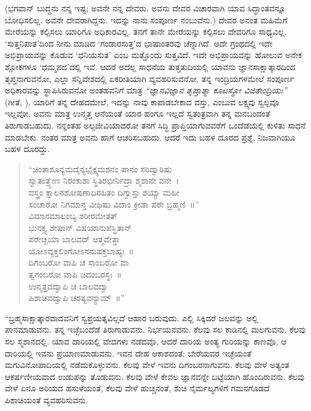 (ಭಗವಾನ್ ಬುದ್ಧನು ನನ್ನ ಇಷ್ಟ; ಅವನೇ ನನ್ನ ದೇವರು. ಅವನು ದೇವರ ವಿಚಾರವಾಗಿ ಯಾವ ಸಿದ್ಧಾಂತವನ್ನೂ ಬೋಧಿಸಲಿಲ್ಲ. ಅವನೇ ದೇವರಾಗಿದ್ದನು. ಇದನ್ನು ನಾನು ಸಂಪೂರ್ಣ ನಂಬುವೆನು.) ದೇವರ ಅನಂತ ಮಹಿಮೆಗೆ ಮೇರೆಯನ್ನು ಕಲ್ಪಿಸಲು ಯಾರಿಗೂ ಅಧಿಕಾರವಿಲ್ಲ. ತನಗೆ ತಾನೇ ಮೇರೆಯನ್ನು ಕಲ್ಪಿಸಲು ದೇವರಿಗೂ ಸಾಧ್ಯವಿಲ್ಲ. ‘ಸುತ್ತನಿಪಾತ’ದಿಂದ ನೀನು ಮಾಡಿದ ‘ಗಂಡಾರಸುತ್ತ’ದ ಭಾಷಾಂತರವು ಚೆನ್ನಾಗಿದೆ. ಅದೇ ಗ್ರಂಥದಲ್ಲಿ ಇದೇ ಅಭಿಪ್ರಾಯವನ್ನು ಕೊಡುವ ‘ಧನಿಯಸುತ’ ಎಂಬ ಮತ್ತೊಂದು ಸುತ್ತವಿದೆ. ಇದೇ ಅಭಿಪ್ರಾಯವನ್ನು ಹೋಲುವ ಅನೇಕ ಶ್ಲೋಕಗಳೂ ‘ಧಮ್ಮಪದ’ದಲ್ಲಿ ಇವೆ. ಆದರೆ ಅದೆಲ್ಲ ಸಾಧನೆಯ ತುತ್ತತುದಿಯಲ್ಲಿ ಯಾವನು ಜ್ಞಾನಸಾಕ್ಷಾತ್ಕಾರದಿಂದ ತೃಪ್ತನಾಗುವನೋ, ಎಲ್ಲಾ ಸನ್ನಿವೇಶದಲ್ಲಿ ಏಕರೀತಿಯಾಗಿ ವ್ಯವಹರಿಸುವನೋ, ತನ್ನ ಇಂದ್ರಿಯಗಳಮೇಲೆ ಸಂಪೂರ್ಣ ಅಧಿಕಾರವನ್ನು ಸ್ಥಾಪಿಸಿರುವನೋ ಅಂತಹವನಿಗೆ ಮಾತ್ರ\enginline{-} \textit{ “ಜ್ಞಾನವಿಜ್ಞಾನ ತೃಪ್ತಾತ್ಮಾ ಕೂಟಸ್ಥೋ ವಿಜಿತೇಂದ್ರಿಯಃ” } (ಗೀತೆ, ), ಯಾರಿಗೆ ತನ್ನ ದೇಹದಮೇಲೆ, ಇದನ್ನು ನಾವು ಕಾಪಾಡಬೇಕಾದ ವಸ್ತು, ಎಂಬುವ ಲಕ್ಷ್ಯವು ಸ್ವಲ್ಪವೂ ಇಲ್ಲವೋ, ಅವನು ಮಾತ್ರ ಉನ್ಮತ್ತ ಆನೆಯಂತೆ ಯಾರ ಹಂಗೂ ಇಲ್ಲದೆ ಸ್ವತಂತ್ರವಾಗಿ ತನ್ನ ಮನಬಂದಂತೆ ತಿರುಗಾಡಬಹುದು. ನನ್ನಂತಹ ಅಲ್ಪಜೀವಿಯಾದರೋ ತನಗೆ ಸಿದ್ಧಿ ಪ್ರಾಪ್ತಿಯಾಗುವವರೆಗೆ ಒಂದೆಡೆಯಲ್ಲಿ ಕುಳಿತು ಸಾಧನೆ ಮಾಡಬೇಕು. ನಂತರ ಮಾತ್ರ ಅವನು ಹಾಗೆ ಆಚರಿಸಬಹುದು. ಆದರೆ ಇದು ಬಹಳ ದೂರದ ಪ್ರಶ್ನೆ, ನಿಜವಾಗಿಯೂ ಬಹಳ ದೂರದ್ದು.

\begin{verse}
 “ಚಿಂತಾಶೂನ್ಯಮದೈನ್ಯಭೈಕ್ಷ್ಯಮಶನಂ ಪಾನಂ ಸರಿದ್ವಾರಿಷು\\
 ಸ್ವಾತಂತ್ರ್ಯೇಣ ನಿರಂಕುಶಾ ಸ್ಥಿತಿರಭೀರ್ನಿದ್ರಾ ಶ್ಮಶಾನೇ ವನೇ~।\\
 ವಸ್ತ್ರಂ ಕ್ಷಾಲನಶೋಷಣಾದಿರಹಿತಂ ದಿಗ್ವಾಸ್ತು ಶಯ್ಯಾ ಮಹೀ\\
 ಸಂಚಾರೋ ನಿಗಮಾನ್ತ ವೀಥಿಷು ವಿದಾಂ ಕ್ರೀಡಾ ಪರೇ ಬ್ರಹ್ಮಣಿ~॥”\\
 ವಿಮಾನಮಾಲಂಬ್ಯ ಶರೀರಮೇತತ್\\
 ಭುನಕ್ತ್ಯ ಶೇಷಾನ್ ವಿಷಯಾನುಪಸ್ಥಿತಾನ್\\
 ಪರೇಚ್ಛಯಾ ಬಾಲವದ್ ಆತ್ಮವೇತ್ತಾ\\
 ಯೋಽವ್ಯಕ್ತಲಿಂಗೋಽನನುಷಕ್ತಬಾಹ್ಯಃ~॥\\
 ದಿಗಂಬರೋ ವಾಪಿ ಚ ಸಾಂಬರೋ ವಾ\\
 ತ್ವಗಂಬರೋ ವಾಪಿ ಚಿದಂಬರಸ್ಥಃ~॥\\
 ಉನ್ಮತ್ತವದ್ವಾಪಿ ಚ ಬಾಲವದ್ವಾ\\
 ಪಿಶಾಚವದ್ವಾಪಿ ಚರತ್ಯವನ್ಯಾಮ್~॥” 
\end{verse}


“ಬ್ರಹ್ಮಸಾಕ್ಷಾತ್ಕಾರವಾದವನಿಗೆ ಸ್ವಪ್ರಯತ್ನವಿಲ್ಲದೆ ಆಹಾರ ಬರುವುದು. ಎಲ್ಲಿ ಸಿಕ್ಕಿದರೆ ಜಲವನ್ನು ಅಲ್ಲಿ ಪಾನಮಾಡುವನು. ತನ್ನ ಇಚ್ಛೆಬಂದೆಡೆ ತಿರುಗಾಡುವನು. ನಿರ್ಭಯನವನು. ಕೆಲವು ಸಲ ಕಾಡಿನಲ್ಲಿ ಮಲಗುವನು, ಕೆಲವು ಸಲ ಸ್ಮಶಾನದಲ್ಲಿ. ಯಾವ ದಾರಿಯಲ್ಲಿ ವೇದಗಳು ನಡೆದವೊ, ಆದರೆ ದಾರಿಯ ಅಂತ್ಯ ಗುರಿಯನ್ನು ಕಾಣವೊ, ಆ ದಾರಿಯಲ್ಲಿ ಇವನು ಪ್ರಯಾಣಮಾಡುವನು. ಇವನ ದೇಹ ಆಕಾಶದಂತೆ; ಬೇರೆಯವರ ಇಚ್ಛೆಯಂತೆ ಮಗುವಿನೋಪಾದಿಯಲ್ಲಿ ನಡೆದುಕೊಳ್ಳುವನು. ಕೆಲವು ವೇಳೆ ಇವನು ದಿಗಂಬರನಾಗುವನು. ಕೆಲವು ವೇಳೆ ಅತ್ಯಂತ ಆಕರ್ಷಣೀಯವಾದ ಉಡುಪನ್ನು ತೊಡುವನು. ಕೆಲವು ವೇಳೆ ಕೇವಲ ಜ್ಞಾನವನ್ನೇ ಬಟ್ಟೆಯಾಗಿ ಹೊಂದಿರುವನು. ಕೆಲವು ವೇಳೆ ಏನೂ ಅರಿಯದ ಹಸುಳೆಯಂತೆ, ಕೆಲವು ವೇಳೆ ಹುಚ್ಚನಂತೆ, ಶುಚಿ ನೈರ್ಮಲ್ಯಗಳಿಗೆ ಗಮನಗೊಡದೆ ಪಿಶಾಚಿಯಂತೆ ವ್ಯವಹರಿಸುವನು.

